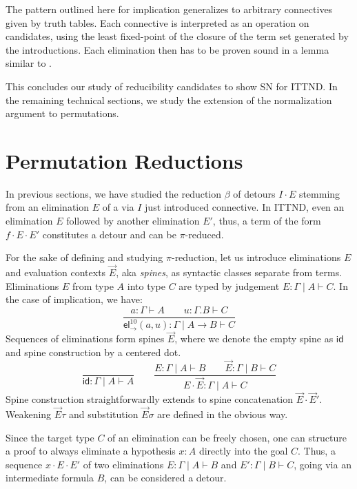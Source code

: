 \documentclass[a4paper,USenglish,cleveref, autoref, thm-restate]{lipics-v2019}
\newcommand{\tid}{\mathsf{id}}
\newcommand{\ru}{\dfrac}
\newcommand{\tel}{\mathsf{el}}
\newcommand{\el}[2]{\ensuremath{\tel_{#1}^{#2}}}
\begin{document}
The pattern outlined here for implication generalizes to arbitrary
connectives given by truth tables.  Each connective is interpreted as
an operation on candidates, using the least fixed-point of the closure
of the term set generated by the introductions.  Each elimination then
has to be proven sound in a lemma similar to .

This concludes our study of reducibility candidates to show SN for ITTND.
In the remaining technical
sections, we study the extension of the normalization argument to
permutations.

\section{Permutation Reductions}
\label{sec:perm}


In previous sections, we have studied the reduction $\beta$ of detours
$I \cdot E$
stemming from an elimination $E$ of a via $I$ just introduced connective.
%
In ITTND, even an elimination $E$ followed by another elimination
$E'$, thus, a term of the form $f \cdot E \cdot E'$ constitutes a
detour and can be $\pi$-reduced.

For the sake of defining and studying $\pi$-reduction, let us
introduce eliminations $E$ and evaluation contexts $\vec E$, aka
\emph{spines}, as syntactic classes separate from terms.  Eliminations
$E$ from type $A$ into type $C$ are typed by judgement
$E : \Gamma \mid A \vdash C$.  In the case of implication, we have:
\[
  \ru{a : \Gamma \vdash A \qquad u : \Gamma.B \vdash C
    }{\el\to{10}(a,u) : \Gamma \mid A \to B \vdash C}
\]
Sequences of eliminations form spines $\vec E$, where we
denote the empty spine as $\tid$ and spine construction by a
centered dot.
\[
  \ru{}{\tid : \Gamma \mid A \vdash A}
\qquad
  \ru{E : \Gamma \mid A \vdash B \qquad
      \vec E : \Gamma \mid B \vdash C
    }{E \cdot \vec E : \Gamma \mid A \vdash C}
\]
Spine construction straightforwardly extends to spine
concatenation $\vec E \cdot \vec E'$.
Weakening $\vec E \tau$ and substitution $\vec E \sigma$ are defined
in the obvious way.

Since the target type $C$ of an elimination can be freely chosen, one
can structure a proof to always eliminate a hypothesis $x : A$
directly into the goal $C$.
Thus, a sequence $x \cdot E \cdot E'$ of two eliminations
$E : \Gamma \mid A \vdash B$ and $E' : \Gamma \mid B \vdash C$, going via an
intermediate formula $B$, can be considered a detour.
\end{document}
